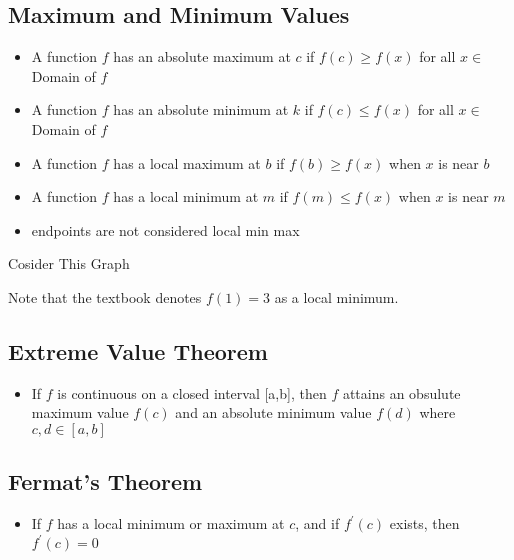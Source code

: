 \documentclass{report}
\begin{document}
    \subsection{Maximum and Minimum Values}
    \bigbreak \noindent 
    \begin{itemize}
      \item A function $f$ has an absolute maximum at  $c$ if $f(c) \geq f(x)$ for all $x \in$ Domain of $f$
      \item A function $f$ has an absolute minimum at $k$ if  $f(c) \leq f(x)$ for all  $x \in$ Domain of  $f$
      \item A function $f$ has a local maximum at  $b$ if  $f(b) \geq f(x)$ when  $x$ is near  $b$
      \item A function $f$ has a local minimum at  $m$ if  $f(m) \leq f(x)$ when  $x$ is near  $m$
      \item endpoints are not considered local min max
    \end{itemize}
    \bigbreak \noindent \bigbreak \noindent
    Cosider This Graph
    \begin{figure}[ht]
        \centering
        \label{fig:graph123}
    \end{figure}
    \bigbreak \noindent \bigbreak \noindent
    Note that the textbook denotes $f(1)=3 $ as a local minimum.

    \bigbreak \noindent \bigbreak \noindent 
    \subsection{Extreme Value Theorem}
    \begin{itemize}
      \item If $f$ is continuous on a closed interval [a,b], then $f$ attains an
      obsulute maximum value $f(c)$ and an absolute minimum value $f(d)$ where $c,d \in [a,b]$
    \end{itemize}

    \bigbreak \noindent \bigbreak \noindent 
    \subsection{Fermat's Theorem}
    \begin{itemize}
      \item If $f$ has a local minimum or maximum at $c$, and if $f^{\prime}(c)$ exists, 
      then $f^{\prime}(c)=0$
    \end{itemize}
\end{document}
